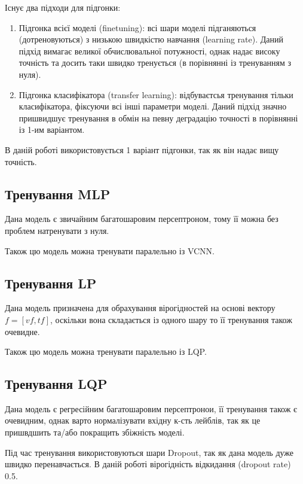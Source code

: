\documentclass{udstu}
\begin{document}
Існує два підходи для підгонки:

\begin{enumerate}[1)]
	\item Підгонка всієї моделі (finetuning):
	всі шари моделі підганяються (дотреновуються) з низькою швидкістю навчання (learning rate).
	Даний підхід вимагає великої обчислювальної потужності, однак надає високу точність та
	досить таки швидко тренується (в порівнянні із тренуванням з нуля).

	\item Підгонка класифікатора (transfer learning):
	відбуваєтсья тренування тільки класифікатора, фіксуючи всі інші параметри моделі.
	Даний підхід значно пришвидшує тренування в обмін на певну деградацію точності в порівнянні із 1-им варіантом.
\end{enumerate}

В даній роботі використовується 1 варіант підгонки, так як він надає вищу точність.


\subsection{Тренування MLP}

Дана модель є звичайним багатошаровим персептроном, тому її
можна без проблем натренувати з нуля.

Також цю модель можна тренувати паралельно із VCNN.


\subsection{Тренування LP}

Дана модель призначена для обрахування вірогідностей на основі вектору $f = [vf, tf]$, оскільки вона
складається із одного шару то її тренування також очевидне.

Також цю модель можна тренувати паралельно із LQP.


\subsection{Тренування LQP}

Дана модель є регресійним багатошаровим персептронои, її тренування також є очевидним,
однак варто нормалізувати вхідну к-сть лейблів, так як це пришвдшить та/або покращить збіжність моделі.

Під час тренування використовуються шари Dropout, так як дана модель дуже швидко перенавчається.
В даній роботі вірогідність відкидання (dropout rate) 0.5.
\end{document}
